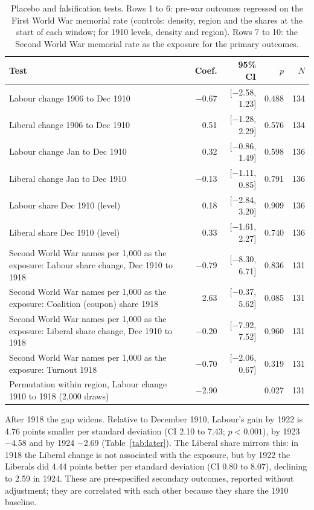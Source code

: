 \documentclass[11pt,a4paper]{article}
\begin{document}
\begin{table}[tbp]\centering\footnotesize\caption{Placebo and falsification tests. Rows 1 to 6: pre-war outcomes regressed on the First World War memorial rate (controls: density, region and the shares at the start of each window; for 1910 levels, density and region). Rows 7 to 10: the Second World War memorial rate as the exposure for the primary outcomes.}\label{tab:placebo}\begin{tabular}{p{8.3cm}rrrr}\toprule Test & Coef. & 95\% CI & $p$ & $N$\\\midrule
Labour change 1906 to Dec 1910 & $-$0.67 & [$-$2.58, 1.23] & 0.488 & 134\\
Liberal change 1906 to Dec 1910 & 0.51 & [$-$1.28, 2.29] & 0.576 & 134\\
Labour change Jan to Dec 1910 & 0.32 & [$-$0.86, 1.49] & 0.598 & 136\\
Liberal change Jan to Dec 1910 & $-$0.13 & [$-$1.11, 0.85] & 0.791 & 136\\
Labour share Dec 1910 (level) & 0.18 & [$-$2.84, 3.20] & 0.909 & 136\\
Liberal share Dec 1910 (level) & 0.33 & [$-$1.61, 2.27] & 0.740 & 136\\
Second World War names per 1,000 as the exposure: Labour share change, Dec 1910 to 1918 & $-$0.79 & [$-$8.30, 6.71] & 0.836 & 131\\
Second World War names per 1,000 as the exposure: Coalition (coupon) share 1918 & 2.63 & [$-$0.37, 5.62] & 0.085 & 131\\
Second World War names per 1,000 as the exposure: Liberal share change, Dec 1910 to 1918 & $-$0.20 & [$-$7.92, 7.52] & 0.960 & 131\\
Second World War names per 1,000 as the exposure: Turnout 1918 & $-$0.70 & [$-$2.06, 0.67] & 0.319 & 131\\
Permutation within region, Labour change 1910 to 1918 (2,000 draws) & $-$2.90 & & 0.027 & 131\\
\bottomrule\end{tabular}\end{table}

After 1918 the gap widens. Relative to December 1910, Labour's gain by 1922 is 4.76 points smaller per standard deviation (CI 2.10 to 7.43; $p<0.001$), by 1923 $-$4.58 and by 1924 $-$2.69 (Table~\ref{tab:later}). The Liberal share mirrors this: in 1918 the Liberal change is not associated with the exposure, but by 1922 the Liberals did 4.44 points better per standard deviation (CI 0.80 to 8.07), declining to 2.59 in 1924. These are pre-specified secondary outcomes, reported without adjustment; they are correlated with each other because they share the 1910 baseline.
\end{document}
